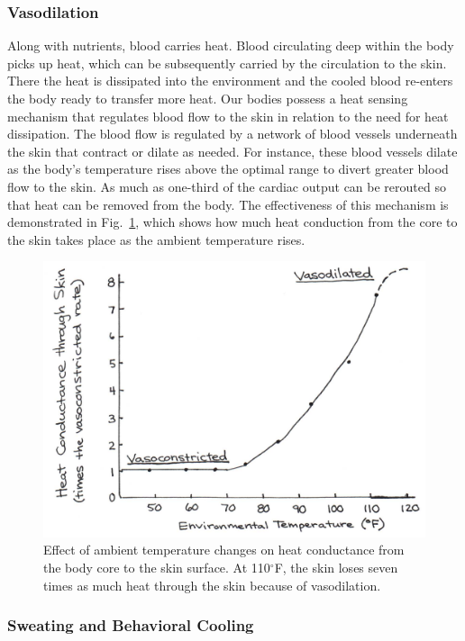 \subsubsection{Vasodilation}
Along with nutrients, blood carries heat.  Blood circulating deep within the body picks up heat, which can be subsequently carried by the circulation to the skin.  There the heat is dissipated into the environment and the cooled blood re-enters the body ready to transfer more heat.  Our bodies possess a heat sensing mechanism that regulates blood flow to the skin in relation to the need for heat dissipation. The blood flow is regulated by a network of blood vessels underneath the skin that contract or dilate as needed. For instance, these blood vessels dilate as the body’s temperature rises above the optimal range to divert greater blood flow to the skin. As much as one-third of the cardiac output can be rerouted so that heat can be removed from the body.  The effectiveness of this mechanism is demonstrated in Fig.~\ref{Fig4-3}, which shows how much heat conduction from the core to the skin takes place as the ambient temperature rises.  
\begin{figure}[h]
	\centering
	\includegraphics[width=\textwidth]{./figures/Topic4/Fig4-3.jpg}
	\caption{Effect of ambient temperature changes on heat conductance from the body core to the skin surface.  At 110$^{\circ}$F, the skin loses seven times as much heat through the skin because of vasodilation.}
	\label{Fig4-3}
\end{figure}
  
\subsubsection{Sweating and Behavioral Cooling}

